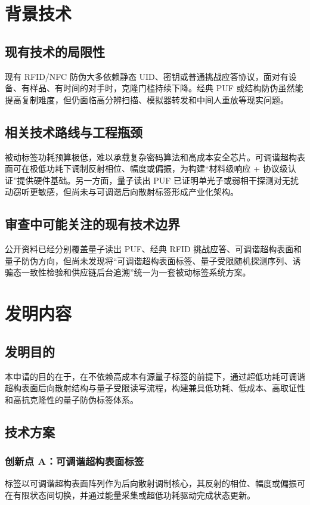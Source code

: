 ﻿\documentclass[12pt,a4paper]{article}
\begin{document}
\section{背景技术}
\subsection{现有技术的局限性}
现有 RFID/NFC 防伪大多依赖静态 UID、密钥或普通挑战应答协议，面对有设备、有样品、有时间的对手时，克隆门槛持续下降。经典 PUF 或结构防伪虽然能提高复制难度，但仍面临高分辨扫描、模拟器转发和中间人重放等现实问题。

\subsection{相关技术路线与工程瓶颈}
被动标签功耗预算极低，难以承载复杂密码算法和高成本安全芯片。可调谐超构表面可在极低功耗下调制反射相位、幅度或偏振，为构建“材料级响应 + 协议级认证”提供硬件基础。另一方面，量子读出 PUF 已证明单光子或弱相干探测对无扰动窃听更敏感，但尚未与可调谐后向散射标签形成产业化架构。

\subsection{审查中可能关注的现有技术边界}
公开资料已经分别覆盖量子读出 PUF、经典 RFID 挑战应答、可调谐超构表面和量子防伪方向，但尚未发现将“可调谐超构表面标签、量子受限随机探测序列、诱骗态一致性检验和供应链后台追溯”统一为一套被动标签系统方案。

\section{发明内容}
\subsection{发明目的}
本申请的目的在于，在不依赖高成本有源量子标签的前提下，通过超低功耗可调谐超构表面后向散射结构与量子受限读写流程，构建兼具低功耗、低成本、高取证性和高抗克隆性的量子防伪标签体系。

\subsection{技术方案}
\subsubsection{创新点 A：可调谐超构表面标签}
标签以可调谐超构表面阵列作为后向散射调制核心，其反射的相位、幅度或偏振可在有限状态间切换，并通过能量采集或超低功耗驱动完成状态更新。
\end{document}
